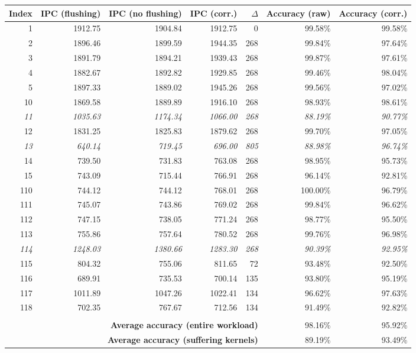 \begin{tabular}{|r|r|r|r|r|r|r|}
  \hline
    \textbf{Index} & \textbf{IPC (flushing)} & \textbf{IPC (no flushing)} & \textbf{IPC (corr.)} & \textbf{$\Delta$} & \textbf{Accuracy (raw)} & \textbf{Accuracy (corr.)} \\
  \hline
  \hline
    1 & 1912.75 & 1904.84 & 1912.75 & 0 & 99.58\% & 99.58\% \\
    2 & 1896.46 & 1899.59 & 1944.35 & 268 & 99.84\% & 97.64\% \\
    3 & 1891.79 & 1894.21 & 1939.43 & 268 & 99.87\% & 97.61\% \\
    4 & 1882.67 & 1892.82 & 1929.85 & 268 & 99.46\% & 98.04\% \\
    5 & 1897.33 & 1889.02 & 1945.26 & 268 & 99.56\% & 97.02\% \\
  \hline
    10 & 1869.58 & 1889.89 & 1916.10 & 268 & 98.93\% & 98.61\% \\
    \textit{11} & \textit{1035.63} & \textit{1174.34} & \textit{1066.00} & \textit{268} & \textit{88.19\%} & \textit{90.77\%} \\
    12 & 1831.25 & 1825.83 & 1879.62 & 268 & 99.70\% & 97.05\% \\
    \textit{13} & \textit{640.14} & \textit{719.45} & \textit{696.00} & \textit{805} & \textit{88.98\%} & \textit{96.74\%} \\
    14 & 739.50 & 731.83 & 763.08 & 268 & 98.95\% & 95.73\% \\
    15 & 743.09 & 715.44 & 766.91 & 268 & 96.14\% & 92.81\% \\
  \hline
    110 & 744.12 & 744.12 & 768.01 & 268 & 100.00\% & 96.79\% \\
    111 & 745.07 & 743.86 & 769.02 & 268 & 99.84\% & 96.62\% \\
    112 & 747.15 & 738.05 & 771.24 & 268 & 98.77\% & 95.50\% \\
    113 & 755.86 & 757.64 & 780.52 & 268 & 99.76\% & 96.98\% \\
    \textit{114} & \textit{1248.03} & \textit{1380.66} & \textit{1283.30} & \textit{268} & \textit{90.39\%} & \textit{92.95\%} \\
    115 & 804.32 & 755.06 & 811.65 & 72 & 93.48\% & 92.50\% \\
    116 & 689.91 & 735.53 & 700.14 & 135 & 93.80\% & 95.19\% \\
    117 & 1011.89 & 1047.26 & 1022.41 & 134 & 96.62\% & 97.63\% \\
    118 & 702.35 & 767.67 & 712.56 & 134 & 91.49\% & 92.82\% \\
  \hline
    \multicolumn{7}{c}{} \\
  \cline{6-7}
    \multicolumn{5}{r|}{\textbf{Average accuracy (entire workload)}} & 98.16\% & 95.92\% \\
    \multicolumn{5}{r|}{\textbf{Average accuracy (suffering kernels)}} & 89.19\% & 93.49\% \\
  \cline{6-7}
\end{tabular}
